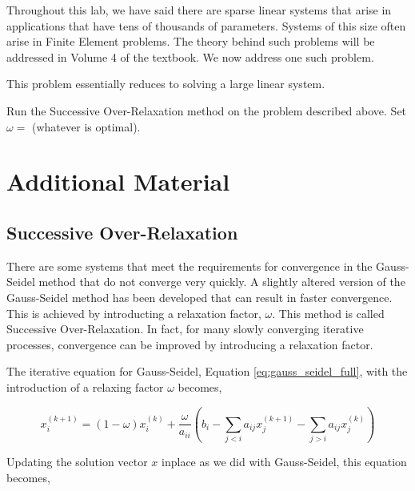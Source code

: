 Throughout this lab, we have said there are sparse linear systems that arise in applications that have tens of thousands of parameters. Systems of this size
often arise in Finite Element problems. The theory behind such problems will be
addressed in Volume 4 of the textbook. We now address one such problem.

\begin{problem} \label{prob:application}

This problem essentially reduces to solving a large linear system.


Run the Successive Over-Relaxation method on the problem described above. Set
$\omega = $ (whatever is optimal).

\end{problem}

\newpage

\section*{Additional Material} %

\subsection*{Successive Over-Relaxation} %

There are some systems that meet the requirements for convergence in the
Gauss-Seidel method that do not converge very quickly. A slightly altered version
of the Gauss-Seidel method has been developed that can result in faster convergence.
This is achieved by introducting a relaxation factor, $\omega$. This method is
called Successive Over-Relaxation. In fact, for many slowly converging iterative processes, convergence can be improved by introducing a relaxation factor.

The iterative equation for Gauss-Seidel, Equation \ref{eq:gauss_seidel_full},
with the introduction of a relaxing factor $\omega$ becomes,

$$
x_i^{(k+1)} = (1 - \omega)x_i^{(k)} + \frac{\omega}{a_{ii}} \left (b_i - \sum_{j < i}a_{ij}x^{(k+1)}_j - \sum_{j > i}a_{ij}x^{(k)}_j \right )
$$

Updating the solution vector $x$ inplace as we did with Gauss-Seidel, this
equation becomes,

